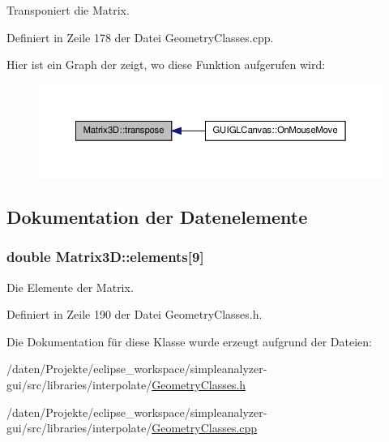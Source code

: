 Transponiert die Matrix. 



Definiert in Zeile 178 der Datei Geometry\-Classes.\-cpp.



Hier ist ein Graph der zeigt, wo diese Funktion aufgerufen wird\-:\nopagebreak
\begin{figure}[H]
\begin{center}
\leavevmode
\includegraphics[width=350pt]{classMatrix3D_a0d59cb6ea927264477a10b9d427966d6_icgraph}
\end{center}
\end{figure}




\subsection{Dokumentation der Datenelemente}
\hypertarget{classMatrix3D_aa24b85b09060684ec1559f22857ccfee}{
\subsubsection[{elements}]{\setlength{\rightskip}{0pt plus 5cm}double Matrix3\-D\-::elements\mbox{[}9\mbox{]}\hspace{0.3cm}{\ttfamily [private]}}}\label{classMatrix3D_aa24b85b09060684ec1559f22857ccfee}


Die Elemente der Matrix. 



Definiert in Zeile 190 der Datei Geometry\-Classes.\-h.



Die Dokumentation für diese Klasse wurde erzeugt aufgrund der Dateien\-:\begin{DoxyCompactItemize}
\item 
/daten/\-Projekte/eclipse\-\_\-workspace/simpleanalyzer-\/gui/src/libraries/interpolate/\hyperlink{GeometryClasses_8h}{Geometry\-Classes.\-h}\item 
/daten/\-Projekte/eclipse\-\_\-workspace/simpleanalyzer-\/gui/src/libraries/interpolate/\hyperlink{GeometryClasses_8cpp}{Geometry\-Classes.\-cpp}\end{DoxyCompactItemize}
